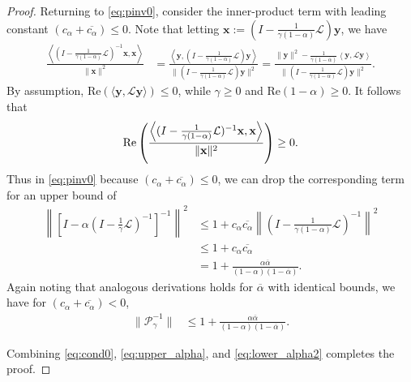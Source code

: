 \documentclass[review]{siamart}
\begin{document}
\begin{proof}
Returning to \eqref{eq:pinv0}, consider the inner-product term with leading
constant $(c_\alpha+\overline{c_\alpha}) \leq 0$. Note that letting
$\mathbf{x}:= (I - \tfrac{1}{\gamma(1-\alpha)}\mathcal{L})\mathbf{y}$,
we have
%
\begin{align*}
\frac{\left\langle (I - \tfrac{1}{\gamma(1-\alpha)}\mathcal{L})^{-1}\mathbf{x},
		\mathbf{x}\right\rangle}{\|\mathbf{x}\|^2}
& = \frac{\left\langle \mathbf{y}, (I - \tfrac{1}{\gamma(1-\alpha)}\mathcal{L})\mathbf{y}
	\right\rangle}{\|(I - \tfrac{1}{\gamma(1-\alpha)}\mathcal{L})\mathbf{y}\|^2}
= \frac{\|\mathbf{y}\|^2 - \frac{1}{\gamma (1 - \overline{\alpha})}
	\left\langle \mathbf{y},\mathcal{L}\mathbf{y} \right\rangle}
	{\|(I - \tfrac{1}{\gamma(1-\alpha)}\mathcal{L})\mathbf{y}\|^2}.
\end{align*}
%
By assumption, Re$\left(\langle \mathbf{y},\mathcal{L}\mathbf{y}\rangle\right) \leq 0$,
while $\gamma\geq 0$ and Re$(1-\alpha) \geq 0$. It follows that
%
\begin{align*}
\textnormal{Re}\left(\frac{\left\langle (I - \tfrac{1}{\gamma(1-\alpha)}\mathcal{L})^{-1}\mathbf{x},
	\mathbf{x}\right\rangle}{\|\mathbf{x}\|^2}\right) \geq 0.
\end{align*}
%
Thus in \eqref{eq:pinv0} because $(c_\alpha+\overline{c_\alpha}) \leq 0$, we can drop
the corresponding term for an upper bound of
%
\begin{align*}
\left\|\left[I - \alpha\left(I - \tfrac{1}{\gamma}\mathcal{L}\right)^{-1}\right]^{-1}\right\|^2
	& \leq 1 + c_\alpha\overline{c_\alpha}
		\left\|(I - \tfrac{1}{\gamma(1-\alpha)}\mathcal{L})^{-1}\right\|^2 \\
& \leq 1 + c_\alpha\overline{c_\alpha} \\
& = 1 + \frac{\alpha\overline{\alpha}}{(1 - \alpha)(1 - \overline{\alpha})}.
\end{align*}
%
Again noting that analogous derivations holds for $\overline{\alpha}$ with
identical bounds, we have for $(c_\alpha+\overline{c_\alpha}) < 0$,
%
\begin{align}
\|\mathcal{P}_\gamma^{-1}\| & \leq 1 +
	\frac{\alpha\overline{\alpha}}{(1 - \alpha)(1 - \overline{\alpha})}. \label{eq:lower_alpha2}
\end{align}
%

Combining \eqref{eq:cond0}, \eqref{eq:upper_alpha},
and \eqref{eq:lower_alpha2} completes the proof.
\end{proof}
%
\end{document}
